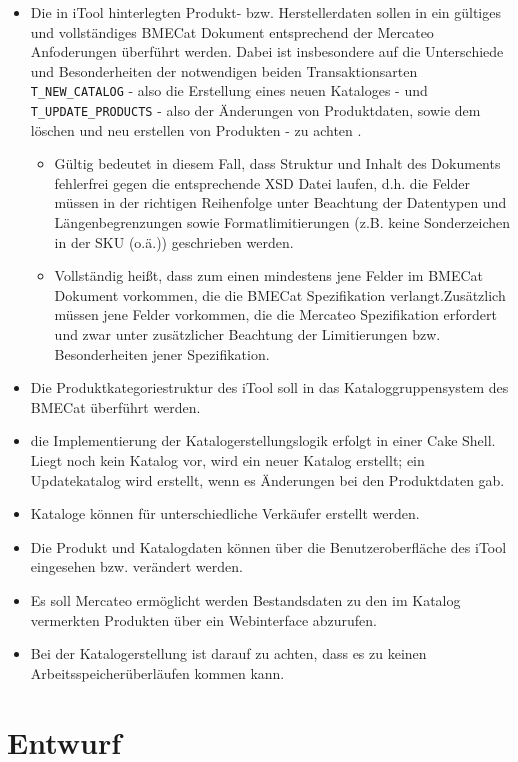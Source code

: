 	\begin{itemize}[noitemsep]
	\item Die in iTool hinterlegten Produkt- bzw. Herstellerdaten sollen in ein gültiges und vollständiges BMECat Dokument entsprechend der Mercateo Anfoderungen überführt werden. Dabei ist insbesondere auf die Unterschiede und Besonderheiten der notwendigen beiden Transaktionsarten \texttt{T\_NEW\_CATALOG} - also die Erstellung eines neuen Kataloges - und \texttt{T\_UPDATE\_PRODUCTS} - also der Änderungen von Produktdaten, sowie dem löschen und neu erstellen von Produkten - zu achten .
		\begin{itemize}[noitemsep]
		\item Gültig bedeutet in diesem Fall, dass Struktur und Inhalt des Dokuments fehlerfrei gegen die entsprechende XSD Datei laufen, d.h. die Felder müssen in der richtigen Reihenfolge unter Beachtung der Datentypen und Längenbegrenzungen sowie Formatlimitierungen (z.B. keine Sonderzeichen in der SKU (o.ä.)) geschrieben werden.
		\item Vollständig heißt, dass zum einen mindestens jene Felder im BMECat Dokument vorkommen, die die BMECat Spezifikation verlangt.Zusätzlich müssen jene Felder vorkommen, die die Mercateo Spezifikation erfordert und zwar unter zusätzlicher Beachtung der Limitierungen bzw. Besonderheiten jener Spezifikation. 	
		\end{itemize}
		
	\item Die Produktkategoriestruktur des iTool soll in das Kataloggruppensystem des BMECat überführt werden.
	\item die Implementierung der Katalogerstellungslogik erfolgt in einer Cake Shell. Liegt noch kein Katalog vor, wird ein neuer Katalog erstellt; ein Updatekatalog wird erstellt, wenn es Änderungen bei den Produktdaten gab. 
	\item Kataloge können für unterschiedliche Verkäufer erstellt werden.
	\item Die Produkt und Katalogdaten können über die Benutzeroberfläche des iTool eingesehen bzw. verändert werden. 
	\item Es soll Mercateo ermöglicht werden Bestandsdaten zu den im Katalog vermerkten Produkten über ein Webinterface abzurufen.
	\item Bei der Katalogerstellung ist darauf zu achten, dass es zu keinen Arbeitsspeicherüberläufen kommen kann.
	\end{itemize}
	\pagebreak	
	\section{Entwurf}
	
